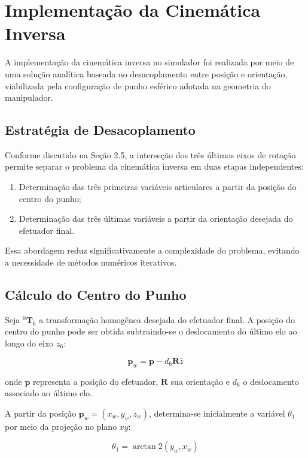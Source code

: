 \section{Implementação da Cinemática Inversa}

A implementação da cinemática inversa no simulador foi realizada por meio de uma solução analítica baseada no desacoplamento entre posição e orientação, viabilizada pela configuração de punho esférico adotada na geometria do manipulador.

\subsection{Estratégia de Desacoplamento}

Conforme discutido na Seção 2.5, a interseção dos três últimos eixos de rotação permite separar o problema da cinemática inversa em duas etapas independentes:

\begin{enumerate}
    \item Determinação das três primeiras variáveis articulares a partir da posição do centro do punho;
    \item Determinação das três últimas variáveis a partir da orientação desejada do efetuador final.
\end{enumerate}

Essa abordagem reduz significativamente a complexidade do problema, evitando a necessidade de métodos numéricos iterativos.

\subsection{Cálculo do Centro do Punho}

Seja $^0\mathbf{T}_6$ a transformação homogênea desejada do efetuador final. A posição do centro do punho pode ser obtida subtraindo-se o deslocamento do último elo ao longo do eixo $z_6$:

\begin{equation}
\mathbf{p}_w = \mathbf{p} - d_6 \mathbf{R} \hat{z}
\end{equation}

onde $\mathbf{p}$ representa a posição do efetuador, $\mathbf{R}$ sua orientação e $d_6$ o deslocamento associado ao último elo.

A partir da posição $\mathbf{p}_w = (x_w, y_w, z_w)$, determina-se inicialmente a variável $\theta_1$ por meio da projeção no plano $xy$:

\begin{equation}
\theta_1 = \arctan2(y_w, x_w)
\end{equation}

